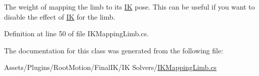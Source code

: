 The weight of mapping the limb to it\textquotesingle{}s \mbox{\hyperlink{class_root_motion_1_1_final_i_k_1_1_i_k}{IK}} pose. This can be useful if you want to disable the effect of \mbox{\hyperlink{class_root_motion_1_1_final_i_k_1_1_i_k}{IK}} for the limb. 



Definition at line 50 of file I\+K\+Mapping\+Limb.\+cs.



The documentation for this class was generated from the following file\+:\begin{DoxyCompactItemize}
\item 
Assets/\+Plugins/\+Root\+Motion/\+Final\+I\+K/\+I\+K Solvers/\mbox{\hyperlink{_i_k_mapping_limb_8cs}{I\+K\+Mapping\+Limb.\+cs}}\end{DoxyCompactItemize}

